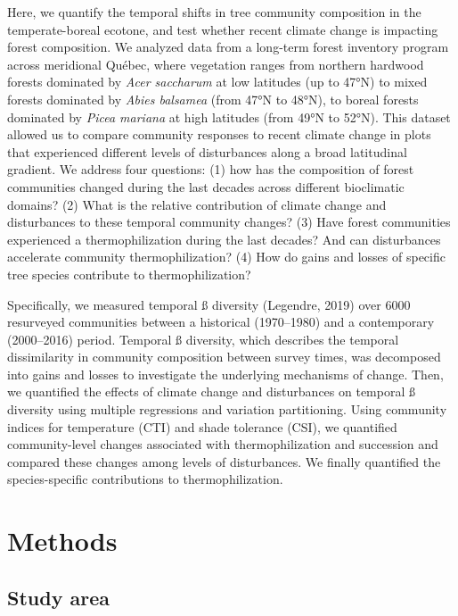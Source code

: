 \documentclass[a4paperpaper,]{article}
\begin{document}
Here, we quantify the temporal shifts in tree community composition in
the temperate-boreal ecotone, and test whether recent climate change is
impacting forest composition. We analyzed data from a long-term forest
inventory program across meridional Québec, where vegetation ranges from
northern hardwood forests dominated by \emph{Acer saccharum} at low
latitudes (up to 47°N) to mixed forests dominated by \emph{Abies
balsamea} (from 47°N to 48°N), to boreal forests dominated by
\emph{Picea mariana} at high latitudes (from 49°N to 52°N). This dataset
allowed us to compare community responses to recent climate change in
plots that experienced different levels of disturbances along a broad
latitudinal gradient. We address four questions: (1) how has the
composition of forest communities changed during the last decades across
different bioclimatic domains? (2) What is the relative contribution of
climate change and disturbances to these temporal community changes? (3)
Have forest communities experienced a thermophilization during the last
decades? And can disturbances accelerate community thermophilization?
(4) How do gains and losses of specific tree species contribute to
thermophilization?

Specifically, we measured temporal ß diversity (Legendre, 2019) over
6000 resurveyed communities between a historical (1970--1980) and a
contemporary (2000--2016) period. Temporal ß diversity, which describes
the temporal dissimilarity in community composition between survey
times, was decomposed into gains and losses to investigate the
underlying mechanisms of change. Then, we quantified the effects of
climate change and disturbances on temporal ß diversity using multiple
regressions and variation partitioning. Using community indices for
temperature (CTI) and shade tolerance (CSI), we quantified
community-level changes associated with thermophilization and succession
and compared these changes among levels of disturbances. We finally
quantified the species-specific contributions to thermophilization.

\hypertarget{methods}{%
\section{Methods}\label{methods}}

\hypertarget{study-area}{%
\subsection{Study area}\label{study-area}}
\end{document}
